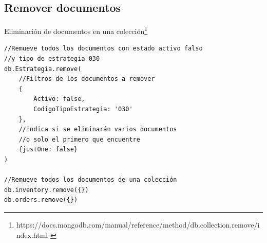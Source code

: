 \documentclass[a4paper,11pt]{paper}
\begin{document}
\newpage
\hypertarget{remover-documentos}{%
\subsection{Remover documentos}\label{remover-documentos}}
Eliminación de documentos en una colección\footnote{https://docs.mongodb.com/manual/reference/method/db.collection.remove/index.html \cite{doc}}
\begin{verbatim}
//Remueve todos los documentos con estado activo falso 
//y tipo de estrategia 030
db.Estrategia.remove(
    //Filtros de los documentos a remover
    {
        Activo: false,
        CodigoTipoEstrategia: '030'
    },
    //Indica si se eliminarán varios documentos 
    //o solo el primero que encuentre 
    {justOne: false}
)

//Remueve todos los documentos de una colección
db.inventory.remove({})
db.orders.remove({})
\end{verbatim}

\newpage


\end{document}
